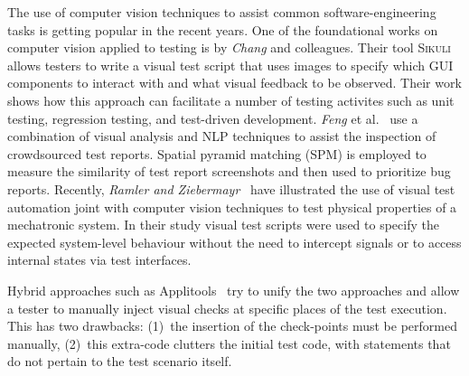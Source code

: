 The use of computer vision techniques to assist common software-engineering tasks is getting popular in the recent years. One of the foundational works on computer vision applied to testing is by \textit{Chang} and colleagues. Their tool \textsc{Sikuli}~\cite{Sikuli} allows testers to write a visual test script that uses images to specify which GUI components to interact with and what visual feedback to be observed. Their work shows how this approach can facilitate a number of testing activites such as unit testing, regression testing, and test-driven development. \textit{Feng} et al.~\cite{Feng:2016:MTR:2970276.2970367} use a combination of visual analysis and NLP techniques to assist the inspection of crowdsourced test reports. Spatial pyramid matching (SPM) is employed to measure the similarity of test report screenshots and then used to prioritize bug reports. 
Recently, \textit{Ramler and Ziebermayr}~\cite{2017-Ramler-ICSTW} have illustrated the use of visual test automation joint with computer vision techniques to test physical properties of a mechatronic system. In their study visual test scripts were used to specify the expected system-level behaviour without the need to intercept signals or to access internal states via test interfaces.

Hybrid approaches such as Applitools~\cite{applitools} try to unify the two approaches and allow a tester to manually inject visual checks at specific places of the test execution. This has two drawbacks: (1)~the insertion of the check-points must be performed manually, (2)~this extra-code clutters the initial test code, with statements that do not pertain to the test scenario itself.
